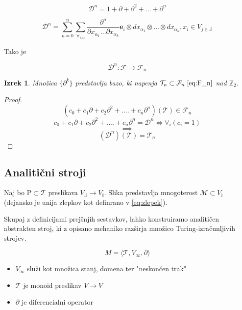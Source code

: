 \documentclass{article}
\newcommand{\II}{\mathbb{I}}
\newcommand{\JJ}{\mathbb{J}}
\newcommand{\T}{\mathcal{T}}
\newcommand{\e}{\mathbf{e}}
\newcommand{\F}{\mathcal{F}}
\newcommand{\D}{\partial}
\newcommand{\Dplus}{\mathcal{D}}
\newtheorem{izrek}{Izrek}[section]
\begin{document}
 \begin{equation}\label{eq:DD}
  	\Dplus^n=1+\D+\D^2+...+\D^n
  \end{equation}
  
  \begin{equation}
  	\Dplus^n=\sum\limits_{n=0}^{n}\sum_{\forall_{i,\alpha}}\frac{\partial^n}{\partial
  		    x_{\alpha_1}\ldots \partial x_{\alpha_k}}\e_i\otimes
  		  dx_{\alpha_1}\otimes\ldots \otimes dx_{\alpha_k} , x_i\in V_{j\in\JJ}
  \end{equation}
  
  Tako je
  
   \begin{equation}
   	\Dplus^n:\F\to\F_{n}
   \end{equation}
   
\begin{izrek}
  Množica $\{\partial^k\}$ predstavlja bazo, ki napenja $\T_n\subset\F_n\phantom{.}\eqref{eq:F_n}$ nad $\mathbb{Z}_2$.
 \end{izrek}
 
 \begin{proof} 
 	$$(c_0+c_1\D+c_2\D^2+....+c_n\D^n)(\T)\in\F_n$$
 	$$c_0+c_1\D+c_2\D^2+....+c_n\D^n=\Dplus^n\iff \forall_i(c_i=1)$$
 	$$\implies$$
 	$$(\Dplus^n)(\T)=\T_n$$
 	
  \end{proof}
  

\subsection{Analitični stroji}
   
Naj bo $\mathrm{P}\subset\T$ preslikava $V_\JJ\to V_\II$. Slika predstavlja
mnogoterost $\mathcal{M}\subset V_\II$ (dejansko je unija zlepkov kot definrano
v \ref{eq:zlepek}).

  
  Skupaj z definicijami prejšnjih sestavkov, lahko konstruiramo analitičen abstrakten stroj, ki z opisano mehaniko razširja množico Turing-izračunljivih strojev.
  
  \begin{equation}\label{eq:dTuring}
  M=\langle\T, V_\infty, \D\rangle
  \end{equation}

 \begin{itemize}
 \item
 $V_\infty$ služi kot množica stanj, domena ter "neskončen trak"
 \item
 $\T$ je monoid preslikav $V\to V$
 \item
 $\D$ je diferencialni operator
 \end{itemize}
 
\end{document}
